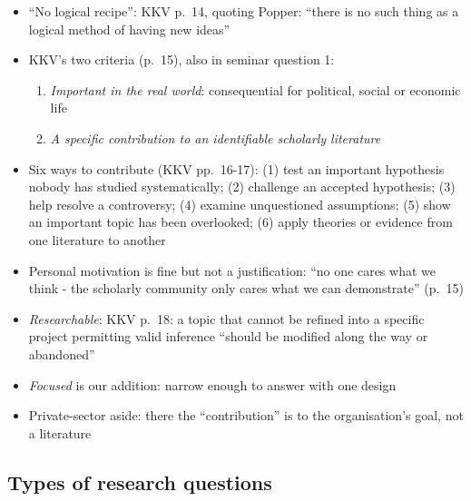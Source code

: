 \documentclass[
  letterpaper,
  DIV=11,
  numbers=noendperiod]{scrartcl}
\providecommand{\tightlist}{%
  \setlength{\itemsep}{0pt}\setlength{\parskip}{0pt}}
\begin{document}
\begin{itemize}
\tightlist
\item
  ``No logical recipe'': KKV p.~14, quoting Popper: ``there is no such
  thing as a logical method of having new ideas''
\item
  KKV's two criteria (p.~15), also in seminar question 1:

  \begin{enumerate}
  \def\labelenumi{\arabic{enumi}.}
  \tightlist
  \item
    \emph{Important in the real world}: consequential for political,
    social or economic life
  \item
    \emph{A specific contribution to an identifiable scholarly
    literature}
  \end{enumerate}
\item
  Six ways to contribute (KKV pp.~16-17): (1) test an important
  hypothesis nobody has studied systematically; (2) challenge an
  accepted hypothesis; (3) help resolve a controversy; (4) examine
  unquestioned assumptions; (5) show an important topic has been
  overlooked; (6) apply theories or evidence from one literature to
  another
\item
  Personal motivation is fine but not a justification: ``no one cares
  what we think - the scholarly community only cares what we can
  demonstrate'' (p.~15)
\item
  \emph{Researchable}: KKV p.~18: a topic that cannot be refined into a
  specific project permitting valid inference ``should be modified along
  the way or abandoned''
\item
  \emph{Focused} is our addition: narrow enough to answer with one
  design
\item
  Private-sector aside: there the ``contribution'' is to the
  organisation's goal, not a literature
\end{itemize}

\subsection{Types of research
questions}\label{types-of-research-questions}
\end{document}
